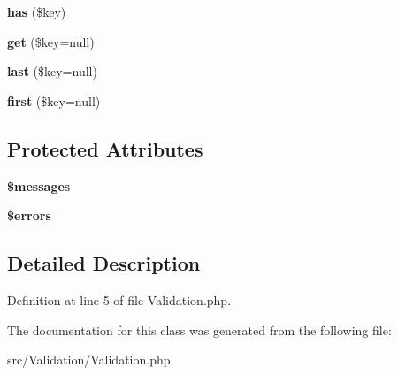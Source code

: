 \begin{DoxyCompactItemize}
{\bfseries has} (\$key)
\item 
\mbox{\label{class_zest_1_1_validation_1_1_validation_a35cbcd6b22933128eaaa6ded4e8d9aef}} 
{\bfseries get} (\$key=null)
\item 
\mbox{\label{class_zest_1_1_validation_1_1_validation_a360a957582276d15bd28200d17d3ed33}} 
{\bfseries last} (\$key=null)
\item 
\mbox{\label{class_zest_1_1_validation_1_1_validation_a8844e8bf9ee1b7d2890e115bb6398cd4}} 
{\bfseries first} (\$key=null)
\end{DoxyCompactItemize}
\subsection*{Protected Attributes}
\begin{DoxyCompactItemize}
\item 
\mbox{\label{class_zest_1_1_validation_1_1_validation_a21a183f927a6d243fe6b4ba3a6c4d4c8}} 
{\bfseries \$messages}
\item 
\mbox{\label{class_zest_1_1_validation_1_1_validation_ab24faf4aa647cdcee494fc48524ad4ff}} 
{\bfseries \$errors}
\end{DoxyCompactItemize}


\subsection{Detailed Description}


Definition at line 5 of file Validation.\+php.



The documentation for this class was generated from the following file\+:\begin{DoxyCompactItemize}
\item 
src/\+Validation/Validation.\+php\end{DoxyCompactItemize}
